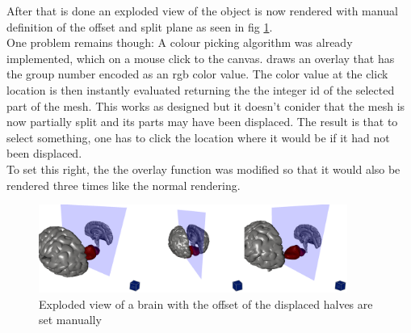 After that is done an exploded view of the object is now rendered with manual definition of the offset and split plane as seen in fig \ref{fig:cerebellum}. \\
One problem remains though: A colour picking algorithm was already implemented, which on a mouse click to the canvas. draws an overlay that has the group number encoded as an rgb color value. The color value at the click location is then instantly evaluated returning the the integer id of the selected part of the mesh. This works as designed but it doesn't conider that the mesh is now partially split and its parts may have been displaced. The result is that to select something, one has to click the location where it would be if it had not been displaced.\\
To set this right, the the overlay function was modified so that it would also be rendered three times like the normal rendering.
\begin{figure}[tb]
	\centering
	\includegraphics[width=0.9\textwidth]{chapters/figures/cerebellum}
	\caption{Exploded view of a brain with the offset of the displaced halves are set manually}
	\label{fig:cerebellum}
\end{figure}

